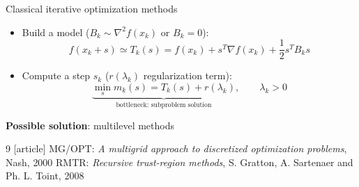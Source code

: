 \documentclass{beamer}
\begin{document}
\begin{frame}{Classical iterative optimization methods}
	
	 
	\begin{itemize}
	\item Build a \alert{model} ($B_k\sim \nabla^2 f(x_k)$ or $B_k=0$):
	\begin{equation*}
	f(x_k+s)\simeq T_{k}(s)=f(x_k)+s^T\nabla f(x_k)+\frac{1}{2}s^TB_ks
	\end{equation*}
	\vspace{-0.5cm}
	\pause
	\item Compute a \alert{step} $s_k$ ($r(\lambda_k)$ regularization term):
	\begin{equation*}
	\underbrace{\min_s m_{k}(s)=T_{k}(s)+r(\lambda_k)}_{\text{bottleneck: subproblem solution}},\qquad \lambda_k>0
	\end{equation*}
	\vspace{-0.5cm}

	\end{itemize}






	
		\vspace{0.5cm}


\begin{block}{ {\bf Possible solution}:  \alert{multilevel methods} }
		
		\begin{small}
	\begin{thebibliography}{9}
		[article]
		 \alert{MG/OPT: } \textit{A multigrid approach to discretized optimization problems}, {\color{black} Nash}, {\color{black} 2000}
		 \alert{RMTR: } \textit{Recursive trust-region methods}, {\color{black} S. Gratton, A. Sartenaer and  Ph. L. Toint, 2008}

	\end{thebibliography} 
	\end{small}


	\end{block}		
\end{frame}
\end{document}
